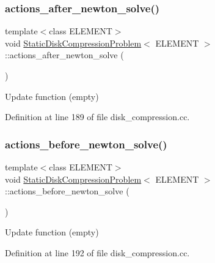 \subsubsection{\texorpdfstring{actions\+\_\+after\+\_\+newton\+\_\+solve()}{actions\_after\_newton\_solve()}}
{\footnotesize\ttfamily template$<$class E\+L\+E\+M\+E\+NT$>$ \\
void \hyperlink{classStaticDiskCompressionProblem}{Static\+Disk\+Compression\+Problem}$<$ E\+L\+E\+M\+E\+NT $>$\+::actions\+\_\+after\+\_\+newton\+\_\+solve (\begin{DoxyParamCaption}{ }\end{DoxyParamCaption})\hspace{0.3cm}{\ttfamily [inline]}}



Update function (empty) 



Definition at line 189 of file disk\+\_\+compression.\+cc.

\mbox{\label{classStaticDiskCompressionProblem_a2b00608d2992b40217248e01b2294153}} 
\subsubsection{\texorpdfstring{actions\+\_\+before\+\_\+newton\+\_\+solve()}{actions\_before\_newton\_solve()}}
{\footnotesize\ttfamily template$<$class E\+L\+E\+M\+E\+NT$>$ \\
void \hyperlink{classStaticDiskCompressionProblem}{Static\+Disk\+Compression\+Problem}$<$ E\+L\+E\+M\+E\+NT $>$\+::actions\+\_\+before\+\_\+newton\+\_\+solve (\begin{DoxyParamCaption}{ }\end{DoxyParamCaption})\hspace{0.3cm}{\ttfamily [inline]}}



Update function (empty) 



Definition at line 192 of file disk\+\_\+compression.\+cc.

\mbox{\label{classStaticDiskCompressionProblem_a9154152d022e86461966b5562f5acba4}} 
